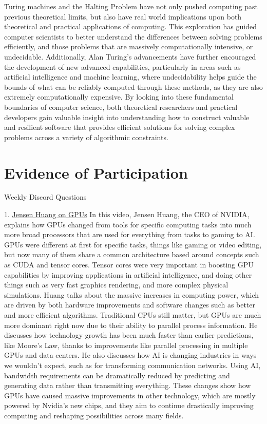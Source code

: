 \documentclass{article}
\theoremstyle{theorem}
\theoremstyle{definition}
\theoremstyle{remark}
\begin{document}
Turing machines and the Halting Problem have not only pushed computing past previous theoretical limits, but also have real world implications upon both theoretical and practical applications of computing. This exploration has guided computer scientists to better understand the differences between solving problems efficiently, and those problems that are massively computationally intensive, or undecidable. Additionally, Alan Turing’s advancements have further encouraged the development of new advanced capabilities, particularly in areas such as artificial intelligence and machine learning, where undecidability helps guide the bounds of what can be reliably computed through these methods, as they are also extremely computationally expensive. By looking into these fundamental boundaries of computer science, both theoretical researchers and practical developers gain valuable insight into understanding how to construct valuable and resilient software that provides efficient solutions for solving complex problems across a variety of algorithmic constraints. 

\section{Evidence of Participation}

Weekly Discord Questions

1. \href{https://www.youtube.com/watch?v=G6R7UOFx1bw}{Jensen Huang on GPUs} \newline
In this video, Jensen Huang, the CEO of NVIDIA, explains how GPUs changed from tools for specific computing tasks into much more broad processors that are used for everything from tasks to gaming to AI. GPUs were different at first for specific tasks, things like gaming or video editing, but now many of them share a common architecture based around concepts such as CUDA and tensor cores. Tensor cores were very important in boosting GPU capabilities by improving applications in artificial intelligence, and doing other things such as very fast graphics rendering, and more complex physical simulations. Huang talks about the massive increases in computing power, which are driven by both hardware improvements and software changes such as better and more efficient algorithms. Traditional CPUs still matter, but GPUs are much more dominant right now due to their ability to parallel process information. He discusses how technology growth has been much faster than earlier predictions, like Moore's Law, thanks to improvements like parallel processing in multiple GPUs and data centers. He also discusses how AI is changing industries in ways we wouldn’t expect, such as for transforming communication networks. Using AI, bandwidth requirements can be dramatically reduced by predicting and generating data rather than transmitting everything. These changes show how GPUs have caused massive improvements in other technology, which are mostly powered by Nvidia's new chips, and they aim to continue drastically improving computing and reshaping possibilities across many fields.
\end{document}
